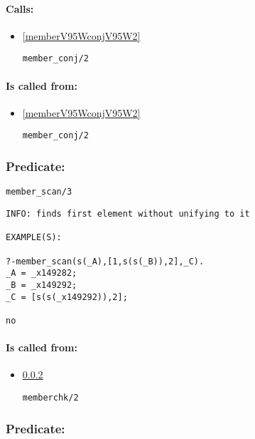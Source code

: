 \paragraph{Calls:} 
\begin{itemize}
\item \ref{memberV95WconjV95W2} 
\begin{verbatim}
member_conj/2
\end{verbatim}

\end{itemize}
\paragraph{Is called from:} 
\begin{itemize}
\item \ref{memberV95WconjV95W2} 
\begin{verbatim}
member_conj/2
\end{verbatim}

\end{itemize}

\subsubsection{Predicate:} \label{memberV95WscanV95W3}

\begin{verbatim}
member_scan/3
\end{verbatim}

{\small \begin{verbatim}
INFO: finds first element without unifying to it

EXAMPLE(S):

?-member_scan(s(_A),[1,s(s(_B)),2],_C).
_A = _x149282;
_B = _x149292;
_C = [s(s(_x149292)),2];

no

\end{verbatim}}
\paragraph{Is called from:} 
\begin{itemize}
\item \ref{memberchkV95W2} 
\begin{verbatim}
memberchk/2
\end{verbatim}

\end{itemize}

\subsubsection{Predicate:} \label{memberchkV95W2}

